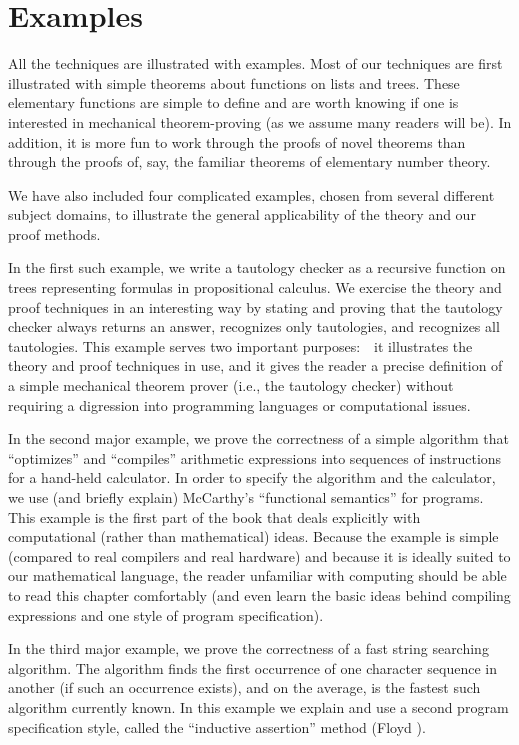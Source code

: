 \documentclass[10pt]{book}
\begin{document}
\section{Examples}
All the techniques are illustrated with examples.  Most of
our techniques are first illustrated with simple theorems about functions
on lists and trees.
These elementary functions
are simple to define and are worth knowing
if one is interested in mechanical theorem-proving (as we assume many readers will be).  In addition, it
is more fun to work through the proofs of novel theorems than through the proofs
of, say,  the familiar theorems of elementary number theory.

We have also included four  complicated examples,
chosen from several different subject domains, to illustrate the
general applicability of the theory and our proof methods.

In the first such example, we write a tautology
checker as a recursive function on
trees representing formulas in  propositional calculus.
We exercise
the theory and proof techniques in an interesting way by stating and
proving that the tautology checker
always returns an answer,  recognizes only
tautologies, and recognizes all tautologies.  This example serves two important
purposes:~~it illustrates the theory and proof techniques in use,
and it gives the reader a precise definition of a simple
mechanical theorem prover (i.e., the tautology checker) without requiring a digression into programming
languages or computational issues.

In the second major example, we prove the correctness
of a simple algorithm that ``optimizes'' and ``compiles'' arithmetic
expressions into sequences of instructions for a hand-held calculator.
In order to specify the algorithm and the calculator, we use
(and briefly explain) McCarthy's ``functional semantics''  \cite{MCCARTHYBASIS} for programs.
This example is the first part of the book that deals explicitly with
computational (rather than mathematical) ideas.  Because the example is
simple (compared to real compilers and real hardware) and because it is
ideally suited to our mathematical language, the reader unfamiliar
with computing should be able to read this chapter comfortably
(and even learn the basic ideas behind compiling expressions and one style of program
specification).

In the third major example, we prove the correctness of a
fast string searching algorithm.  The algorithm finds the
first occurrence of one character sequence in another (if such an occurrence exists), and on the average, is the fastest such algorithm currently known.  In this example
we explain and use a second program specification style, called
the ``inductive assertion'' method (Floyd \cite{FLOYD}).
\end{document}
